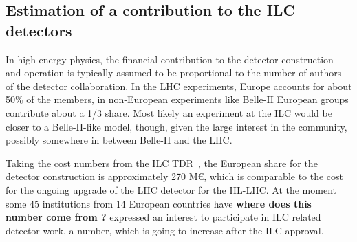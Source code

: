 \documentclass[%
 reprint,
 amsmath,amssymb,
 aps,
]{revtex4-1}
\begin{document}
\subsection{\label{Section:constructionmodel:ILCDet} Estimation of a
contribution to the ILC detectors}

In high-energy physics, the financial contribution to the detector
construction and operation
is typically assumed to be proportional to the number of authors of
the detector collaboration. In the LHC experiments, Europe accounts for about 50\% of the members, in non-European experiments like Belle-II European groups contribute about a 1/3 share. Most likely an experiment at the ILC would be closer to a Belle-II-like model, though, given the large interest in the community, possibly somewhere in between Belle-II and the LHC. 

Taking the cost numbers from the ILC TDR~\cite{Behnke:2013lya}, the European share for the detector construction is approximately 270 M\euro{}, which is comparable to the cost for the ongoing upgrade of the LHC detector for the HL-LHC. At the moment some 45 institutions from 14 European countries have {\bfseries where does this number come from ?} expressed an interest to participate in ILC related detector work, a number, which is going to increase after the ILC approval.


\end{document}
